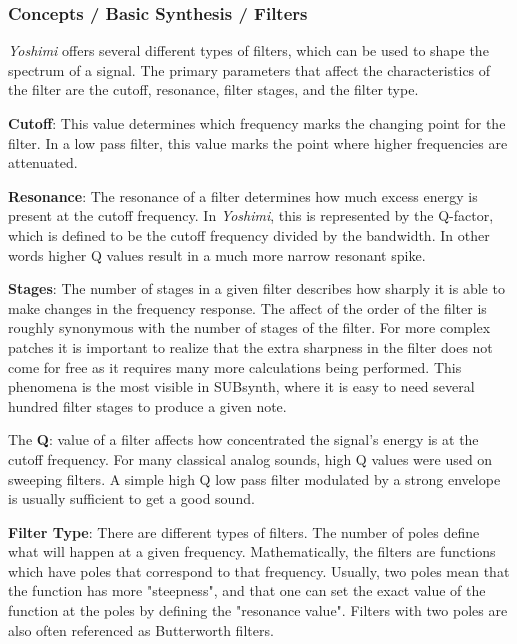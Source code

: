 \subsubsection{Concepts / Basic Synthesis / Filters}
\label{subsubsec:concepts_basics_filters}

   \textsl{Yoshimi}
   offers several different types of filters, which can be used
   to shape the spectrum of a signal. The primary parameters that affect the
   characteristics of the filter are the cutoff, resonance, filter stages,
   and the filter type.

   \textbf{Cutoff}:
   This value determines which frequency marks the changing point for
   the filter. In a low pass filter, this value marks the point where higher
   frequencies are attenuated.

   \textbf{Resonance}:
   The resonance of a filter determines how much excess energy is
   present at the cutoff frequency. In \textsl{Yoshimi},
   this is represented by the Q-factor, which is defined to be the cutoff
   frequency divided by the bandwidth. In other words higher Q values result
   in a much more narrow resonant spike.

   \textbf{Stages}:
   The number of stages in a given filter describes how sharply it is
   able to make changes in the frequency response.
   The affect of the order of the filter is roughly synonymous with the
   number of stages of the filter. For more complex patches it is important
   to realize that the extra sharpness in the filter does not come for free
   as it requires many more calculations being performed. This phenomena is
   the most visible in SUBsynth, where it is easy to need several hundred
   filter stages to produce a given note.

   The \textbf{Q}:
   value of a filter affects how concentrated the signal’s energy is at
   the cutoff frequency.
   For many classical analog sounds, high Q values were used on sweeping
   filters. A simple high Q low pass filter modulated by a strong envelope is
   usually sufficient to get a good sound.

   \textbf{Filter Type}:
   There are different types of filters. The number of poles define what will
   happen at a given frequency. Mathematically, the filters are functions
   which have poles that correspond to that frequency. Usually, two poles
   mean that the function has more "steepness", and that one can set the
   exact value of the function at the poles by defining the "resonance
   value". Filters with two poles are also often referenced as Butterworth
   filters.

